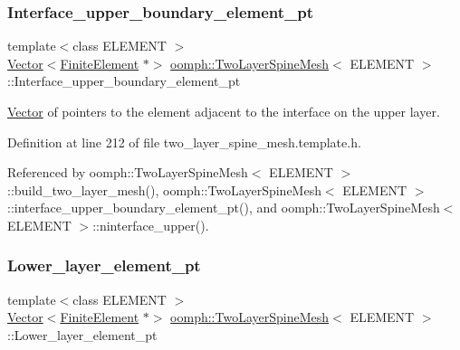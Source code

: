 \subsubsection{\texorpdfstring{Interface\+\_\+upper\+\_\+boundary\+\_\+element\+\_\+pt}{Interface\_upper\_boundary\_element\_pt}}
{\footnotesize\ttfamily template$<$class E\+L\+E\+M\+E\+NT $>$ \\
\hyperlink{classoomph_1_1Vector}{Vector}$<$\hyperlink{classoomph_1_1FiniteElement}{Finite\+Element} $\ast$$>$ \hyperlink{classoomph_1_1TwoLayerSpineMesh}{oomph\+::\+Two\+Layer\+Spine\+Mesh}$<$ E\+L\+E\+M\+E\+NT $>$\+::Interface\+\_\+upper\+\_\+boundary\+\_\+element\+\_\+pt\hspace{0.3cm}{\ttfamily [protected]}}



\hyperlink{classoomph_1_1Vector}{Vector} of pointers to the element adjacent to the interface on the upper layer. 



Definition at line 212 of file two\+\_\+layer\+\_\+spine\+\_\+mesh.\+template.\+h.



Referenced by oomph\+::\+Two\+Layer\+Spine\+Mesh$<$ E\+L\+E\+M\+E\+N\+T $>$\+::build\+\_\+two\+\_\+layer\+\_\+mesh(), oomph\+::\+Two\+Layer\+Spine\+Mesh$<$ E\+L\+E\+M\+E\+N\+T $>$\+::interface\+\_\+upper\+\_\+boundary\+\_\+element\+\_\+pt(), and oomph\+::\+Two\+Layer\+Spine\+Mesh$<$ E\+L\+E\+M\+E\+N\+T $>$\+::ninterface\+\_\+upper().

\mbox{\label{classoomph_1_1TwoLayerSpineMesh_aaadaab14aab4d597dab78758a1a93ad8}} 
\subsubsection{\texorpdfstring{Lower\+\_\+layer\+\_\+element\+\_\+pt}{Lower\_layer\_element\_pt}}
{\footnotesize\ttfamily template$<$class E\+L\+E\+M\+E\+NT $>$ \\
\hyperlink{classoomph_1_1Vector}{Vector}$<$\hyperlink{classoomph_1_1FiniteElement}{Finite\+Element} $\ast$$>$ \hyperlink{classoomph_1_1TwoLayerSpineMesh}{oomph\+::\+Two\+Layer\+Spine\+Mesh}$<$ E\+L\+E\+M\+E\+NT $>$\+::Lower\+\_\+layer\+\_\+element\+\_\+pt\hspace{0.3cm}{\ttfamily [protected]}}



